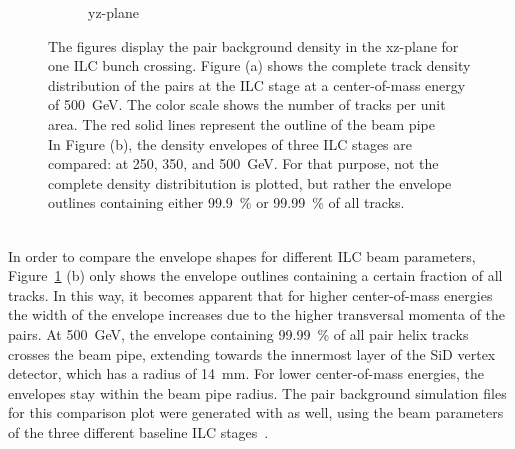 \begin{figure}[!h]
\begin{subfigure}[b]{0.49\textwidth}
   \caption{yz-plane}
   \end{subfigure}
   \caption[Pair background density]{The figures display the pair background density in the xz-plane for one ILC bunch crossing.
   Figure (a) shows the complete track density distribution of the pairs at the ILC stage at a center-of-mass energy of \SI[detect-all]{500}{\GeV}.
   The color scale shows the number of tracks per unit area.
   The red solid lines represent the outline of the beam pipe
   \\In Figure (b), the density envelopes of three ILC stages are compared: at 250, 350, and \SI[detect-all]{500}{\GeV}.
   For that purpose, not the complete density distribitution is plotted, but rather the envelope outlines containing either \SI[detect-all]{99.9}{\percent} or \SI[detect-all]{99.99}{\percent} of all tracks.
   }
   \label{fig:PairBkg:Density}
 \end{figure}
\\In order to compare the envelope shapes for different ILC beam parameters, Figure~\ref{fig:PairBkg:Density} (b) only shows the envelope outlines containing a certain fraction of all tracks.
In this way, it becomes apparent that for higher center-of-mass energies the width of the envelope increases due to the higher transversal momenta of the pairs.
At \SI{500}{\GeV}, the envelope containing \SI{99.99}{\percent} of all pair helix tracks crosses the beam pipe, extending towards the innermost layer of the SiD vertex detector, which has a radius of \SI{14}{\milli\meter}.
For lower center-of-mass energies, the envelopes stay within the beam pipe radius.
The pair background simulation files for this comparison plot were generated with \guineapig as well, using the beam parameters of the three different baseline ILC stages~\cite[p. 11]{TDR1}.
 
